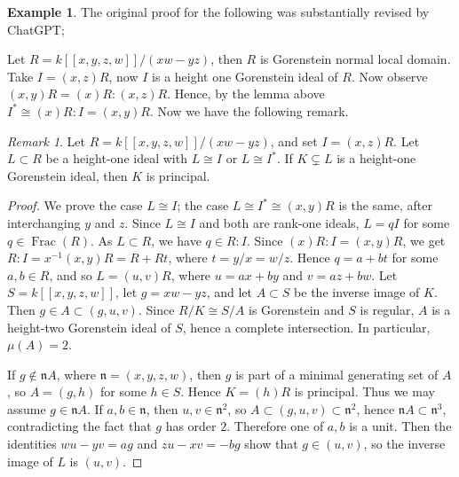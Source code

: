 \documentclass[11pt,letterpaper]{amsart}
\newcommand{\seq}{\subseteq}
\theoremstyle{plain}
\theoremstyle{definition}
\newtheorem{ex}[thm]{Example}
\theoremstyle{remark}
\newtheorem{remark}[thm]{Remark}
\begin{document}
\begin{ex} The original proof for the following was substantially revised by ChatGPT;

Let $R=k[[x,y,z,w]]/(xw-yz)$, then $R$ is Gorenstein normal local domain. Take $I=(x,z)R$, now $I$ is a height one Gorenstein ideal of $R$. Now observe $(x,y)R=(x)R:(x,z)R$. %
Hence, by the lemma above $I^*\cong (x)R:I=(x,y)R$. Now we have the following remark. 

\begin{remark}
Let $R=k[[x,y,z,w]]/(xw-yz)$, and set $I=(x,z)R$. Let $L\subset R$ be a height-one ideal with $L\cong I$ or $L\cong I^*$. If $K\subsetneq L$ is a height-one Gorenstein ideal, then $K$ is principal. 
\end{remark}

\begin{proof}
We prove the case $L\cong I$; the case $L\cong I^*\cong (x,y)R$ is the same, after interchanging $y$ and $z$. Since $L\cong I$ and both are rank-one ideals, $L=qI$ for some $q\in \operatorname{Frac}(R)$. As $L\subset R$, we have $q\in R:I$. Since $(x)R:I=(x,y)R$, we get $R:I=x^{-1}(x,y)R=R+Rt$, where $t=y/x=w/z$. Hence $q=a+bt$ for some $a,b\in R$, and so $L=(u,v)R$, where $u=ax+by$ and $v=az+bw$. Let $S=k[[x,y,z,w]]$, let $g=xw-yz$, and let $A\subset S$ be the inverse image of $K$. Then $g\in A\subset (g,u,v)$. Since $R/K\cong S/A$ is Gorenstein and $S$ is regular, $A$ is a height-two Gorenstein ideal of $S$, hence a complete intersection. In particular, $\mu(A)=2$.

If $g\notin \mathfrak n A$, where $\mathfrak n=(x,y,z,w)$, then $g$ is part of a minimal generating set of $A$, so $A=(g,h)$ for some $h\in S$. Hence $K=(h)R$ is principal. Thus we may assume $g\in \mathfrak n A$. If $a,b\in \mathfrak n$, then $u,v\in \mathfrak n^2$, so $A\subset (g,u,v)\subset \mathfrak n^2$, hence $\mathfrak n A\subset \mathfrak n^3$, contradicting the fact that $g$ has order $2$. Therefore one of $a,b$ is a unit. Then the identities $wu-yv=ag$ and $zu-xv=-bg$ show that $g\in (u,v)$, so the inverse image of $L$ is $(u,v)$.


\end{proof}
\end{ex}
\end{document}

